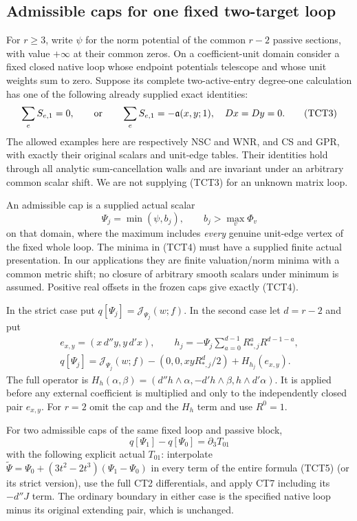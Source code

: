 \subsection{Admissible caps for one fixed two-target loop}

For $r\ge3$, write $\psi$ for the norm potential of the common
$r-2$ passive sections, with value $+\infty$ at their common zeros.
On a coefficient-unit domain consider a fixed closed native loop
whose endpoint potentials telescope and whose unit weights sum to
zero.  Suppose its complete two-active-entry degree-one calculation
has one of the following already supplied exact identities:
\[
 \sum_e S_{e,1}=0,\qquad\hbox{or}\qquad
 \sum_e S_{e,1}=-\mathfrak a(x,y;1),\quad Dx=Dy=0.
 \tag{TCT3}
\]
The allowed examples here are respectively NSC and WNR, and CS
and GPR, with exactly their original scalars and unit-edge tables.
Their identities hold through all analytic sum-cancellation walls
and are invariant under an arbitrary common scalar shift.
We are not supplying (TCT3) for an unknown matrix loop.

An admissible cap is a supplied actual scalar
\[
 \Psi_j=\min(\psi,b_j),\qquad
 b_j>\max_v\Phi_v
 \tag{TCT4}
\]
on that domain, where the maximum includes \emph{every} genuine
unit-edge vertex of the fixed whole loop.  The minima in (TCT4)
must have a supplied finite actual presentation.  In our applications
they are finite valuation/norm minima with a common metric shift;
no closure of arbitrary smooth scalars under minimum is assumed.
Positive real offsets in the frozen caps give exactly (TCT4).

In the strict case put $q[\Psi_j]=\mathcal J_{\Psi_j}(w;f)$.
In the second case let $d=r-2$ and put
\[
\begin{gathered}
 e_{x,y}=(x\,d''y,y\,d'x),\qquad
 h_j=-\Psi_j\sum_{a=0}^{d-1}R_{*,j}^{a}R^{d-1-a},\\
 q[\Psi_j]=\mathcal J_{\Psi_j}(w;f)
       -(0,0,xyR_{*,j}^{d}/2)+H_{h_j}(e_{x,y}).
 \tag{TCT5}
\end{gathered}
\]
The full operator is
$H_h(\alpha,\beta)=(d''h\wedge\alpha,-d'h\wedge\beta,
h\wedge d'\alpha)$.  It is applied before any external coefficient
is multiplied and only to the independently closed pair $e_{x,y}$.
For $r=2$ omit the cap and the $H_h$ term and use $R^0=1$.

\begin{theorem}
For two admissible caps of the same fixed loop and passive block,
\[
             q[\Psi_1]-q[\Psi_0]=\partial_3 T_{01}
 \tag{TCT6}
\]
with the following explicit actual $T_{01}$: interpolate
$\widetilde\Psi=\Psi_0+(3t^2-2t^3)(\Psi_1-\Psi_0)$ in every
term of the entire formula (TCT5) (or its strict version), use the
full CT2 differentials, and apply CT7 including its $-d''J$ term.
The ordinary boundary in either case is the specified native loop
minus its original extending pair, which is unchanged.
\end{theorem}

